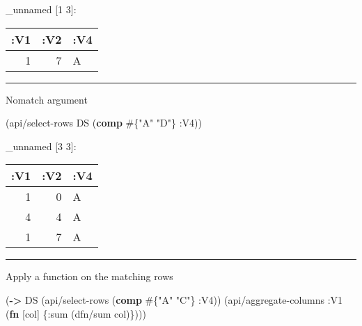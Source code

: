 \documentclass[]{article}
\newenvironment{Shaded}{\begin{snugshade}}{\end{snugshade}}
\newcommand{\KeywordTok}[1]{\textcolor[rgb]{0.13,0.29,0.53}{\textbf{#1}}}
\newcommand{\StringTok}[1]{\textcolor[rgb]{0.31,0.60,0.02}{#1}}
\newcommand{\VariableTok}[1]{\textcolor[rgb]{0.00,0.00,0.00}{#1}}
\newcommand{\AttributeTok}[1]{\textcolor[rgb]{0.77,0.63,0.00}{#1}}
\newcommand{\NormalTok}[1]{#1}
\begin{document}
\begin{Shaded}
\end{Shaded}

\_unnamed {[}1 3{]}:

\begin{longtable}[]{@{}rrl@{}}
\toprule
:V1 & :V2 & :V4\tabularnewline
\midrule
\endhead
1 & 7 & A\tabularnewline
\bottomrule
\end{longtable}

\begin{center}\rule{0.5\linewidth}{0.5pt}\end{center}

Nomatch argument

\begin{Shaded}
\begin{Highlighting}[]
\NormalTok{(api/select-rows DS (}\KeywordTok{comp}\NormalTok{ #\{}\StringTok{"A"} \StringTok{"D"}\NormalTok{\} }\AttributeTok{:V4}\NormalTok{))}
\end{Highlighting}
\end{Shaded}

\_unnamed {[}3 3{]}:

\begin{longtable}[]{@{}rrl@{}}
\toprule
:V1 & :V2 & :V4\tabularnewline
\midrule
\endhead
1 & 0 & A\tabularnewline
4 & 4 & A\tabularnewline
1 & 7 & A\tabularnewline
\bottomrule
\end{longtable}

\begin{center}\rule{0.5\linewidth}{0.5pt}\end{center}

Apply a function on the matching rows

\begin{Shaded}
\begin{Highlighting}[]
\NormalTok{(}\KeywordTok{->}\NormalTok{ DS}
\NormalTok{    (api/select-rows (}\KeywordTok{comp}\NormalTok{ #\{}\StringTok{"A"} \StringTok{"C"}\NormalTok{\} }\AttributeTok{:V4}\NormalTok{))}
\NormalTok{    (api/aggregate-columns }\AttributeTok{:V1}\NormalTok{ (}\KeywordTok{fn}\NormalTok{ [col]}
\NormalTok{                                 \{}\AttributeTok{:sum}\NormalTok{ (dfn/sum col)\})))}
\end{Highlighting}
\end{Shaded}
\end{document}
